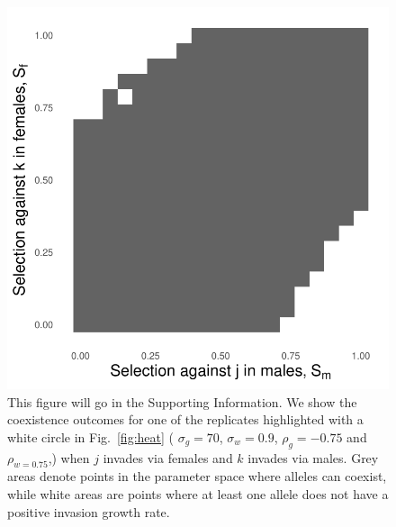 \documentclass[12pt]{article}
\begin{document}
\begin{figure}[H]
  \centerline{\includegraphics[]{outcomes_two.pdf}}
  \caption{This figure will go in the Supporting Information. We show the coexistence outcomes  for one of the replicates highlighted with a white circle in Fig.~\ref{fig:heat} ( $\sigma_{g} = 70$, $\sigma_{w}= 0.9$, $\rho_{g}=-0.75$ and $\rho_{w= 0.75}$,) when $j$ invades via females and $k$ invades via males.  Grey areas denote points in the parameter space where alleles can coexist, while white areas are points where at least one allele does not have a positive invasion growth rate.  }
    \label{fig:outcomes}
\end{figure}
\end{document}
